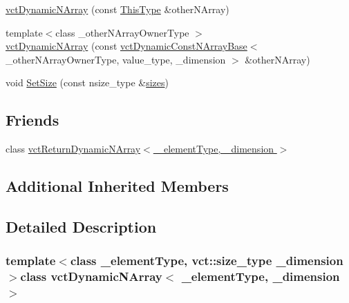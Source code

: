 \begin{DoxyCompactItemize}
\item 
\hyperlink{classvct_dynamic_n_array_a85b7d6a64e101458419cacfab6f69cd0}{vct\-Dynamic\-N\-Array} (const \hyperlink{classvct_dynamic_const_n_array_base_a5123caffcf1455a1b99003877eade897}{This\-Type} \&other\-N\-Array)
\item 
{\footnotesize template$<$class \-\_\-other\-N\-Array\-Owner\-Type $>$ }\\\hyperlink{classvct_dynamic_n_array_a07af3ac98442f2f4e1959ae8c816c749}{vct\-Dynamic\-N\-Array} (const \hyperlink{classvct_dynamic_const_n_array_base}{vct\-Dynamic\-Const\-N\-Array\-Base}$<$ \-\_\-other\-N\-Array\-Owner\-Type, value\-\_\-type, \-\_\-dimension $>$ \&other\-N\-Array)
\end{DoxyCompactItemize}

{\bf }\par
\begin{DoxyCompactItemize}
\item 
void \hyperlink{classvct_dynamic_n_array_a8f800ef9c9406b3fe6252348e3e30b95}{Set\-Size} (const nsize\-\_\-type \&\hyperlink{classvct_dynamic_const_n_array_base_aa86793343d80325ba5671bc24a2e0e8f}{sizes})
\end{DoxyCompactItemize}

\subsection*{Friends}
\begin{DoxyCompactItemize}
\item 
class \hyperlink{classvct_dynamic_n_array_a0887bdbfe80a80b92caf2ced650d161a}{vct\-Return\-Dynamic\-N\-Array$<$ \-\_\-element\-Type, \-\_\-dimension $>$}
\end{DoxyCompactItemize}
\subsection*{Additional Inherited Members}


\subsection{Detailed Description}
\subsubsection*{template$<$class \-\_\-element\-Type, vct\-::size\-\_\-type \-\_\-dimension$>$class vct\-Dynamic\-N\-Array$<$ \-\_\-element\-Type, \-\_\-dimension $>$}

